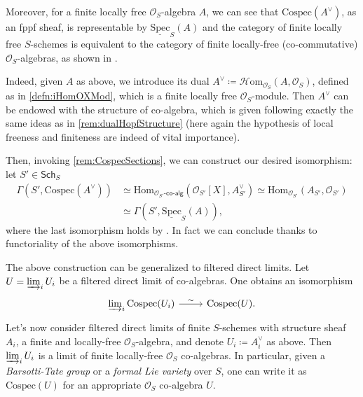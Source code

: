 \documentclass[../Main]{subfiles}
\begin{document}
\begin{rem}[]
	Moreover, for a finite locally free $\mathcal{O}_{ S }$-algebra $A$,
	we can see that $\mathrm{Cospec}(A^{\vee})$, as an fppf sheaf, is representable 
	by $\underline{\mathrm{Spec}}_S(A)$ and
	the category of finite locally free $S$-schemes
	is equivalent to the category of finite locally-free (co-commutative)
	$\mathcal{O}_{ S }$-algebras, as shown in 
	\cite[Chapter III, remark 2.1.2]{Messing}.

	Indeed, given $A$ as above, we introduce its dual
	$A^{\vee} \coloneqq \mathcal{H}\mathrm{om}_{\mathcal{O}_{ S }} \left( A, \mathcal{O}_{ S } \right)$,
	defined as in \cref{defn:iHomOXMod}, which is a
	finite locally free $\mathcal{O}_{ S }$-module.
	Then $A^{\vee}$ can be endowed with the structure of co-algebra, which is
	given following exactly the same ideas as in \cref{rem:dualHopfStructure}
	(here again the hypothesis of local freeness and finiteness are indeed
	of vital importance).

	Then, invoking \cref{rem:CospecSections}, we can construct 
	our desired isomorphism: let $S' \in \mathsf{Sch}_{ S }$
	\begin{align*}
		\Gamma(S', \mathrm{Cospec}(A^{\vee})) &\simeq
		\mathrm{Hom}_{ \mathcal{O}_{ S' }\text{-}\mathsf{co}\text{-}\mathsf{alg}} 
		\left( \mathcal{O}_{ S' }[X], A^\vee_{S'} \right) \simeq
		\mathrm{Hom}_{ \mathcal{O}_{ S' }}
		\left( A_{S'}, \mathcal{O}_{ S' } \right) \\
		&\simeq
		\Gamma(S', \underline{\mathrm{Spec}}_S(A))
	,\end{align*}
	where the last isomorphism holds by 
	\cite[\href{https://stacks.math.columbia.edu/tag/01LV}{Lemma 01LV}]{SP}.
	In fact we can conclude thanks to functoriality of the above isomorphisms.
\end{rem}


\begin{rem}
	The above construction can be generalized to
	filtered direct limits.
	Let $U = \varinjlim_i U_i$ be a filtered direct limit
	of co-algebras. One obtains an isomorphism
	\begin{equation*}
	\begin{tikzcd}[row sep = 0ex
		,/tikz/column 1/.append style={anchor=base east}
		,/tikz/column 2/.append style={anchor=base west}]
		\varinjlim_i \mathrm{Cospec}(U_i) \arrow[r, "\sim", rightarrow] &
		\mathrm{Cospec}(U)
	.\end{tikzcd}
	\end{equation*} 
	Let's now consider filtered direct limits of 
	finite $S$-schemes with structure sheaf $A_i$,
	a finite and locally-free $\mathcal{O}_{ S }$-algebra, 
	and denote $U_i \coloneqq A_i^\vee$ as above.
	Then $\varinjlim_i U_i$ is a limit 
	of finite locally-free $\mathcal{O}_{ S }$ co-algebras.
	In particular, given a {\em Barsotti-Tate group} or a {\em formal Lie variety}
	over $S$, one can write it as $\mathrm{Cospec}(U)$ for an appropriate 
	$\mathcal{O}_{ S }$ co-algebra $U$.
\end{rem}
\end{document}
